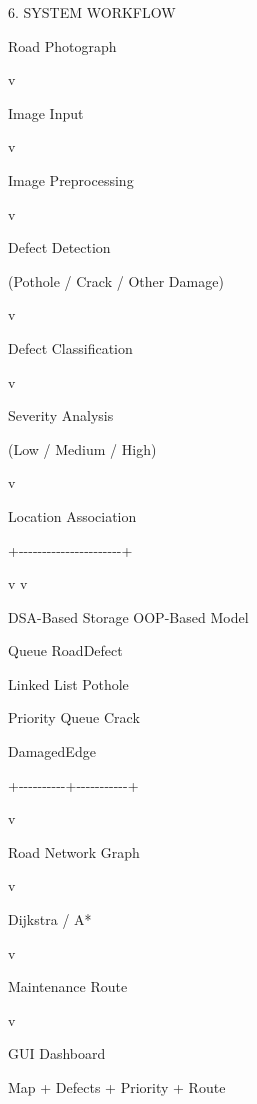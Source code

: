 \documentclass[
]{article}
\begin{document}
6. SYSTEM WORKFLOW

Road Photograph

\textbar{}

v

Image Input

\textbar{}

v

Image Preprocessing

\textbar{}

v

Defect Detection

(Pothole / Crack / Other Damage)

\textbar{}

v

Defect Classification

\textbar{}

v

Severity Analysis

(Low / Medium / High)

\textbar{}

v

Location Association

\textbar{}

+-\/-\/-\/-\/-\/-\/-\/-\/-\/-\/-\/-\/-\/-\/-\/-\/-\/-\/-\/-\/-\/-+

\textbar{} \textbar{}

v v

DSA-Based Storage OOP-Based Model

Queue RoadDefect

Linked List Pothole

Priority Queue Crack

DamagedEdge

\textbar{} \textbar{}

+-\/-\/-\/-\/-\/-\/-\/-\/-\/-+-\/-\/-\/-\/-\/-\/-\/-\/-\/-\/-+

\textbar{}

v

Road Network Graph

\textbar{}

v

Dijkstra / A*

\textbar{}

v

Maintenance Route

\textbar{}

v

GUI Dashboard

Map + Defects + Priority + Route
\end{document}
